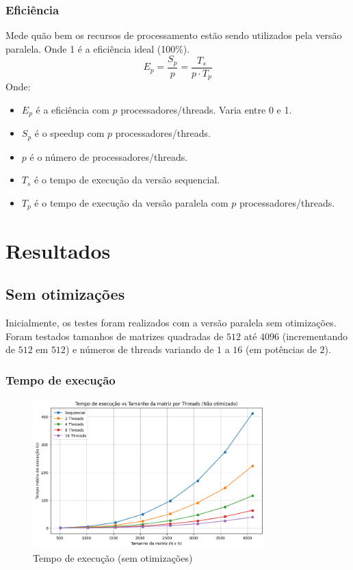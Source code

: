 \documentclass[12pt, a4paper]{article}
\begin{document}
	\subsubsection{Eficiência}
    Mede quão bem os recursos de processamento estão sendo utilizados pela versão paralela. Onde 1 é a eficiência ideal (100\%).
	\[
		E_{p} = \frac{S_{p}}{p}= \frac{T_{s}}{p \cdot T_{p}}
	\]
	Onde:
	\begin{itemize}
		\item $E_{p}$ é a eficiência com $p$ processadores/threads. Varia entre 0 e 1.

		\item $S_{p}$ é o speedup com $p$ processadores/threads.

        \item $p$ é o número de processadores/threads.

        \item $T_{s}$ é o tempo de execução da versão sequencial.

        \item $T_{p}$ é o tempo de execução da versão paralela com $p$ processadores/threads.
	\end{itemize}

	\newpage
	\section{Resultados}

	\subsection{Sem otimizações}

	Inicialmente, os testes foram realizados com a versão paralela sem otimizações. Foram testados tamanhos de matrizes quadradas de $512$ até $4096$ (incrementando de $512$ em $512$) e números de threads variando de $1$ a $16$ (em potências de $2$).

	\subsubsection{Tempo de execução}

	\begin{figure}[H]
		\centering
		\includegraphics[width=0.8\textwidth]{img/execution-time.png}
		\caption{Tempo de execução (sem otimizações)}
		\label{fig:tempo_execucao}
	\end{figure}
\end{document}
